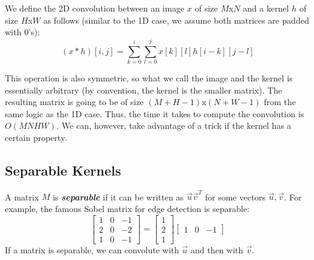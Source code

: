 \documentclass[11pt, oneside]{article}
\newcommand{\emphasis}[1]{\textbf{\textit{#1}}}
\theoremstyle{plain}
\theoremstyle{definition}
\begin{document}
We define the 2D convolution between an image \( x \) of size \( M \)x\( N \)
and a kernel \( h \) of size \( H \)x\( W \) as follows
(similar to the 1D case, we assume both matrices are padded with 0's):
\[ (x * h)[i, j] = \sum^i_{k = 0} \sum^j_{l = 0} x[k][l]h[i - k][j - l] \]

This operation is also symmetric, so  what we call the image and the kernel
is essentially arbitrary (by convention, the kernel is the smaller matrix).
The resulting matrix is going to be of size \( (M + H - 1) \)x\( (N + W - 1) \)
from the same logic as the 1D case. 
Thus, the time it takes to compute the convolution is \( O(MNHW) \).
We can, however, take advantage of a trick if the kernel has a certain property.

\subsection{Separable Kernels}
A matrix \( M \) is \emphasis{separable} if it can be written as
\( \vec{u} \vec{v}^T \) for some vectors \( \vec{u}, \vec{v} \).
For example, the famous Sobel matrix for edge detection is separable:
\[
  \begin{bmatrix}
    1 & 0 & -1 \\
    2 & 0 & -2 \\
    1 & 0 & -1
  \end{bmatrix}
  =
  \begin{bmatrix}
    1 \\
    2 \\ 
    1
  \end{bmatrix}
  \begin{bmatrix}
    1 & 0 & -1
  \end{bmatrix}
\]
If a matrix is separable, we can convolute with
\( \vec{u} \) and then with \( \vec{v} \).
\end{document}
